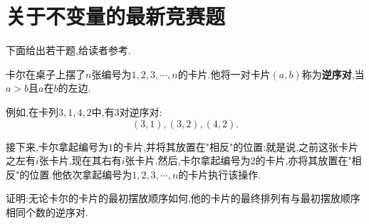 \section{关于不变量的最新竞赛题}
下面给出若干题,给读者参考.
\begin{problem}
    卡尔在桌子上摆了$n$张编号为$1,2,3,\cdots,n$的卡片.他将一对卡片$(a,b)$称为\textbf{逆序对},当$a>b$且$a$在$b$的左边.

    例如,在卡列$3,1,4,2$中,有3对逆序对:$$(3,1),(3,2),(4,2).$$

    接下来,卡尔拿起编号为$1$的卡片,并将其放置在"相反"的位置:就是说,之前这张卡片之左有$i$张卡片,现在其右有$i$张卡片.然后,卡尔拿起编号为$2$的卡片,亦将其放置在"相反"的位置.他依次拿起编号为$1,2,3,\cdots,n$的卡片执行该操作.

    证明:无论卡尔的卡片的最初摆放顺序如何,他的卡片的最终排列有与最初摆放顺序相同个数的逆序对.
\end{problem}
